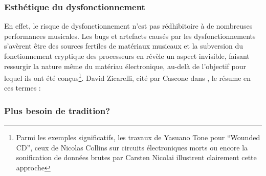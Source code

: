 	
\subsubsection{Esthétique du dysfonctionnement}

\noindent En effet, le risque de dysfonctionnement n'est pas rédhibitoire à de nombreuses performances musicales. Les bugs et artefacts causés par les dysfonctionnements s'avèrent être des sources fertiles de matériaux musicaux et la subversion du fonctionnement cryptique des processeurs en révèle un aspect invisible, faisant ressurgir la nature même du matériau électronique, au-delà de l'objectif pour lequel ils ont été conçus\footnote{Parmi les exemples significatifs, les travaux de Yasuano Tone pour ``Wounded CD'', ceux de Nicolas Collins sur circuits électroniques morts ou encore la sonification de données brutes par Carsten Nicolai illustrent clairement cette approche}. David Zicarelli, cité par Cascone dans \cite{cascone_aesthetics_2000}, le résume en ces termes : 

\subsubsection{Plus besoin de tradition?}


